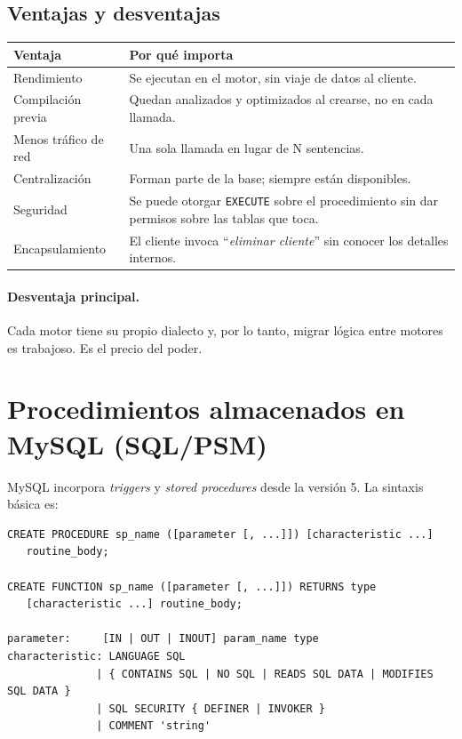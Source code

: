 \documentclass[11pt,a4paper]{article}
\begin{document}
\subsection{Ventajas y desventajas}

\begin{center}
\begin{tabular}{@{}p{3.5cm} p{10.5cm}@{}}
\toprule
\textbf{Ventaja} & \textbf{Por qué importa} \\
\midrule
Rendimiento & Se ejecutan en el motor, sin viaje de datos al
cliente. \\
Compilación previa & Quedan analizados y optimizados al
crearse, no en cada llamada. \\
Menos tráfico de red & Una sola llamada en lugar de N sentencias. \\
Centralización & Forman parte de la base; siempre están
disponibles. \\
Seguridad & Se puede otorgar \texttt{EXECUTE} sobre el
procedimiento sin dar permisos sobre las tablas que toca. \\
Encapsulamiento & El cliente invoca ``\emph{eliminar cliente}''
sin conocer los detalles internos. \\
\bottomrule
\end{tabular}
\end{center}

\paragraph{Desventaja principal.} Cada motor tiene su propio dialecto
y, por lo tanto, migrar lógica entre motores es trabajoso. Es el
precio del poder.

\section{Procedimientos almacenados en MySQL (SQL/PSM)}

MySQL incorpora \emph{triggers} y \emph{stored procedures} desde la
versión 5. La sintaxis básica es:

\begin{lstlisting}
CREATE PROCEDURE sp_name ([parameter [, ...]]) [characteristic ...]
   routine_body;

CREATE FUNCTION sp_name ([parameter [, ...]]) RETURNS type
   [characteristic ...] routine_body;

parameter:     [IN | OUT | INOUT] param_name type
characteristic: LANGUAGE SQL
              | { CONTAINS SQL | NO SQL | READS SQL DATA | MODIFIES SQL DATA }
              | SQL SECURITY { DEFINER | INVOKER }
              | COMMENT 'string'
\end{lstlisting}
\end{document}
